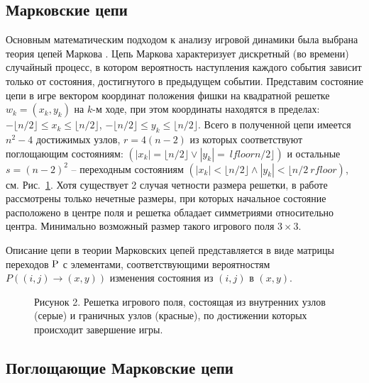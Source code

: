 \subsection{Марковские цепи}\label{subsec:ch1/sec3/sub1}

Основным математическим подходом к анализу игровой динамики была выбрана теория цепей Маркова \cite{markov_chain}.
Цепь Маркова характеризует дискретный (во времени) случайный процесс, в котором вероятность наступления каждого события 
зависит только от состояния, достигнутого в предыдущем событии. Представим состояние цепи в игре вектором координат 
положения фишки на квадратной решетке $w_k = (x_k, y_k)$ на $k$-м ходе, при этом координаты находятся в пределах: 
$-\lfloor n/2 \rfloor \leq x_k \leq \lfloor n/2 \rfloor$, $-\lfloor n/2 \rfloor \leq y_k \leq \lfloor n/2 \rfloor$. 
Всего в полученной цепи имеется $n^2-4$ достижимых узлов, $r=4(n-2)$ из которых соответствуют поглощающим состояниям: 
$(|x_k|=\lfloor n/2 \rfloor \lor |y_k|=\ lfloor n/2 \rfloor)$ и остальные $s=(n-2)^2$ -- переходным состояниям
$(|x_k|<\lfloor n/2 \rfloor \land |y_k|<\lfloor n/2 \ rfloor)$, см. Рис.~\cref{fig:game_field}. 
Хотя существует 2 случая четности размера решетки, в работе рассмотрены только нечетные размеры, при которых 
начальное состояние расположено в центре поля и решетка обладает симметриями относительно центра. 
Минимально возможный размер такого игрового поля $3\times 3$. 

Описание цепи в теории Марковских цепей представляется в виде матрицы переходов \cite{kemeny1983} $\rm P$ с элементами, 
соответствующими вероятностям $P((i, j) \rightarrow (x, y))$ изменения состояния из $(i, j)$ в $(x, y)$.

\begin{figure}[ht]
    \caption{
        Рисунок 2. Решетка игрового поля, состоящая из внутренних узлов (серые) и граничных узлов (красные), по достижении которых происходит завершение игры.
    }\label{fig:game_field}
\end{figure}


\subsection{Поглощающие Марковские цепи}\label{subsec:ch1/sec3/sub2}


